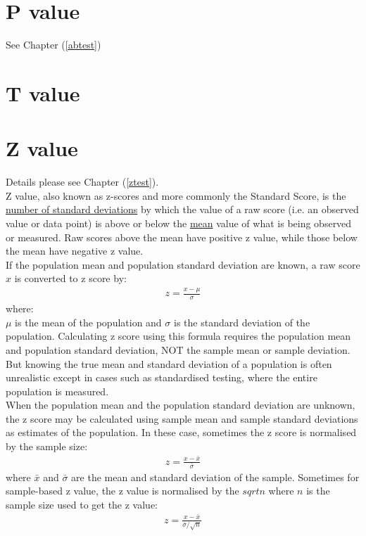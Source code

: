 \section{P value}

See Chapter (\ref{abtest})

\section{T value}

\section{Z value}

Details please see Chapter (\ref{ztest}).\\

Z value, also known as z-scores and more commonly the Standard Score, is the \underline{number of standard deviations} by which the value of a raw score (i.e. an observed value or data point) is above or below the \underline{mean} value of what is being observed or measured. Raw scores above the mean have positive z value, while those below the mean have negative z value. \\

If the population mean and population standard deviation are known, a raw score $x$ is converted to z score by:
\begin{eqnarray}
z = \frac{x - \mu}{\sigma}
\label{zscore}
\end{eqnarray}
where:\\
$\mu$ is the mean of the population and $\sigma$ is the standard deviation of the population. Calculating z score using this formula requires the population mean and population standard deviation, NOT the sample mean or sample deviation.  But knowing the true mean and standard deviation of a population is often unrealistic except in cases such as standardised testing, where the entire population is measured. \\

When the population mean and the population standard deviation are unknown, the z score may be calculated using sample mean and sample standard deviations as estimates of the population. In these case, sometimes the z score is normalised by the sample size:
\begin{eqnarray}
z = \frac{x - \bar{x}}{\bar{\sigma}}
\label{zscorenorm}
\end{eqnarray}
where $\bar{x}$ and $\bar{\sigma}$ are the mean and standard deviation of the sample. Sometimes for sample-based z value, the z value is normalised by the $sqrt{n}$ where $n$ is the sample size used to get the z value:
\begin{eqnarray}
z = \frac{x - \bar{x}}{\bar{\sigma}/\sqrt{n}}
\label{zscorenormv1}
\end{eqnarray}

